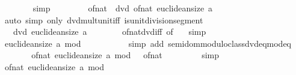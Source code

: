 \begin{isabellebody}
\ \ \ \ \ \ \isamarkupfalse%
\ simp\isanewline
\ \ \ \ \isamarkupfalse%
\ \isamarkupfalse%
\ {\isachardoublequoteopen}{\isasymnot}\ of{\isacharunderscore}{\kern0pt}nat\ {}\ dvd\ of{\isacharunderscore}{\kern0pt}nat\ {\isacharparenleft}{\kern0pt}euclidean{\isacharunderscore}{\kern0pt}size\ a{\isacharparenright}{\kern0pt}{\isachardoublequoteclose}\isanewline
\ \ \ \ \ \ \isamarkupfalse%
\ {\isacharparenleft}{\kern0pt}auto\ simp\ only{\isacharcolon}{\kern0pt}\ dvd{\isacharunderscore}{\kern0pt}mult{\isacharunderscore}{\kern0pt}unit{\isacharunderscore}{\kern0pt}iff{\isacharprime}{\kern0pt}\ is{\isacharunderscore}{\kern0pt}unit{\isacharunderscore}{\kern0pt}division{\isacharunderscore}{\kern0pt}segment{\isacharparenright}{\kern0pt}\isanewline
\ \ \ \ \isamarkupfalse%
\ \isamarkupfalse%
\ {\isachardoublequoteopen}{\isasymnot}\ {}\ dvd\ euclidean{\isacharunderscore}{\kern0pt}size\ a{\isachardoublequoteclose}\isanewline
\ \ \ \ \ \ \isamarkupfalse%
\ of{\isacharunderscore}{\kern0pt}nat{\isacharunderscore}{\kern0pt}dvd{\isacharunderscore}{\kern0pt}iff\ {\isacharbrackleft}{\kern0pt}of\ {}{\isacharbrackright}{\kern0pt}\ \isamarkupfalse%
\ simp\isanewline
\ \ \ \ \isamarkupfalse%
\ \isamarkupfalse%
\ {\isachardoublequoteopen}euclidean{\isacharunderscore}{\kern0pt}size\ a\ mod\ {}\ {\isacharequal}{\kern0pt}\ {}{\isachardoublequoteclose}\isanewline
\ \ \ \ \ \ \isamarkupfalse%
\ {\isacharparenleft}{\kern0pt}simp\ add{\isacharcolon}{\kern0pt}\ semidom{\isacharunderscore}{\kern0pt}modulo{\isacharunderscore}{\kern0pt}class{\isachardot}{\kern0pt}dvd{\isacharunderscore}{\kern0pt}eq{\isacharunderscore}{\kern0pt}mod{\isacharunderscore}{\kern0pt}eq{\isacharunderscore}{\kern0pt}{}{\isacharparenright}{\kern0pt}\isanewline
\ \ \ \ \isamarkupfalse%
\ \isamarkupfalse%
\ {\isachardoublequoteopen}of{\isacharunderscore}{\kern0pt}nat\ {\isacharparenleft}{\kern0pt}euclidean{\isacharunderscore}{\kern0pt}size\ a\ mod\ {}{\isacharparenright}{\kern0pt}\ {\isacharequal}{\kern0pt}\ of{\isacharunderscore}{\kern0pt}nat\ {}{\isachardoublequoteclose}\isanewline
\ \ \ \ \ \ \isamarkupfalse%
\ simp\isanewline
\ \ \ \ \isamarkupfalse%
\ \isamarkupfalse%
\ {\isachardoublequoteopen}of{\isacharunderscore}{\kern0pt}nat\ {\isacharparenleft}{\kern0pt}euclidean{\isacharunderscore}{\kern0pt}size\ a{\isacharparenright}{\kern0pt}\ mod\ {}\ {\isacharequal}{\kern0pt}\ {}{\isachardoublequoteclose}\isanewline

\end{isabellebody}
